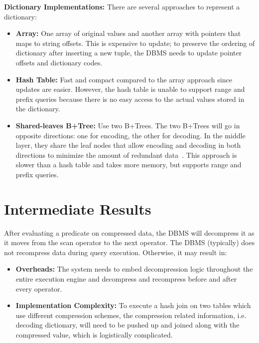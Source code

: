 \documentclass[11pt]{article}
\begin{document}
\textbf{Dictionary Implementations:} There are several approaches to represent a dictionary:
\begin{itemize}
    \item \textbf{Array:} One array of original values and another array with pointers that maps to string offsets. This is expensive to update; to preserve the ordering of dictionary after inserting a new tuple, the DBMS needs to update pointer offsets and dictionary codes.
    \item \textbf{Hash Table:} Fast and compact compared to the array approach since updates are easier. However, the hash table is unable to support range and prefix queries because there is no easy access to the actual values stored in the dictionary.
    \item \textbf{Shared-leaves B+Tree:} Use two B+Trees. The two B+Trees will go in opposite directions: one for encoding, the other for decoding. In the middle layer, they share the leaf nodes that allow encoding and decoding in both directions to minimize the amount of redundant data~\cite{p283-binnig}. This approach is slower than a hash table and takes more memory, but supports range and prefix queries.
\end{itemize}

\section{Intermediate Results}
After evaluating a predicate on compressed data,
the DBMS will decompress it as it moves from the
scan operator to the next operator. The DBMS (typically) does not recompress data during query execution. Otherwise, it may result in:
\begin{itemize}
    \item \textbf{Overheads:} The system needs to embed decompression logic throughout the entire execution engine and decompress and recompress before and after every operator.
    \item \textbf{Implementation Complexity:} To execute a hash join on two tables which use different compression schemes, the compression related information, i.e. decoding dictionary, will need to be pushed up and joined along with the compressed value, which is logistically complicated.
\end{itemize}

\newpage


\end{document}
